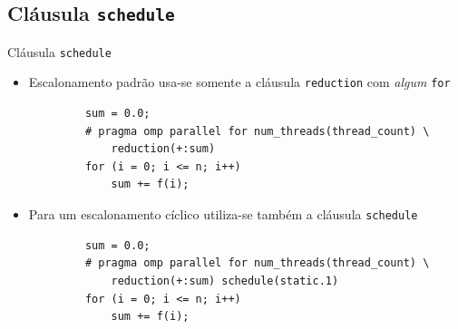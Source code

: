 	\subsection{Cláusula {\tt schedule}}
	\begin{frame}[fragile]{Cláusula {\tt schedule}}
		\begin{itemize}
			\item Escalonamento padrão usa-se somente a cláusula {\tt reduction} com \textit{algum} {\tt for}
		\end{itemize}
		\begin{verbatim}
			sum = 0.0;
			# pragma omp parallel for num_threads(thread_count) \
				reduction(+:sum)		
			for (i = 0; i <= n; i++)
				sum += f(i);
		\end{verbatim}

		\begin{itemize}
			\item Para um escalonamento cíclico utiliza-se também a cláusula {\tt schedule}
		\end{itemize}
		
		\begin{verbatim}
			sum = 0.0;
			# pragma omp parallel for num_threads(thread_count) \
				reduction(+:sum) schedule(static.1)
			for (i = 0; i <= n; i++)
				sum += f(i);
		\end{verbatim}
\end{frame}

